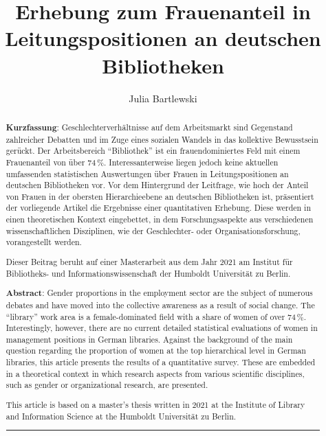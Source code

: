 \documentclass[a4paper,
fontsize=11pt,
oneside,
numbers=noperiodatend,
parskip=half-,
bibliography=totoc,
final
]{scrartcl}
\title{\LARGE{Erhebung zum Frauenanteil in Leitungspositionen an deutschen Bibliotheken}}%
\author{Julia Bartlewski} %
\date{}
\begin{document}
\maketitle
\thispagestyle{fancyplain} 

\begin{abstract}
\noindent
\textbf{Kurzfassung}: Geschlechterverhältnisse auf dem Arbeitsmarkt sind Gegenstand zahlreicher Debatten und im Zuge eines sozialen Wandels in das kollektive Bewusstsein gerückt. Der Arbeitsbereich \enquote{Bibliothek} ist ein frauendominiertes Feld mit einem Frauenanteil von über 74\,\%. Interessanterweise liegen jedoch keine aktuellen umfassenden statistischen Auswertungen über Frauen in Leitungspositionen an deutschen Bibliotheken vor. Vor dem Hintergrund der Leitfrage, wie hoch der Anteil von Frauen in der obersten Hierarchieebene an deutschen Bibliotheken ist, präsentiert der vorliegende Artikel die Ergebnisse einer quantitativen Erhebung. Diese werden in einen theoretischen Kontext eingebettet, in dem Forschungsaspekte aus verschiedenen wissenschaftlichen Disziplinen, wie der Geschlechter- oder Organisationsforschung, vorangestellt werden.

Dieser Beitrag beruht auf einer Masterarbeit aus dem Jahr 2021 am Institut für Bibliotheks- und Informationswissenschaft der Humboldt Universität zu Berlin.

\vspace*{1em}
\noindent
\textbf{Abstract}: Gender proportions in the employment sector are the subject of numerous debates and have moved into the collective awareness as a result of social change. The \enquote{library} work area is a female-dominated field with a share of women of over 74\,\%. Interestingly, however, there are no current detailed statistical evaluations of women in management positions in German libraries. Against the background of the main question regarding the proportion of women at the top hierarchical level in German libraries, this article presents the results of a quantitative survey. These are embedded in a theoretical context in which research aspects from various scientific disciplines, such as gender or organizational research, are presented.

This article is based on a master's thesis written in 2021 at the Institute of Library and Information Science at the Humboldt Universität zu Berlin.

\begin{center}\rule{0.5\linewidth}{0.5pt}\end{center}
\end{abstract}
\end{document}
